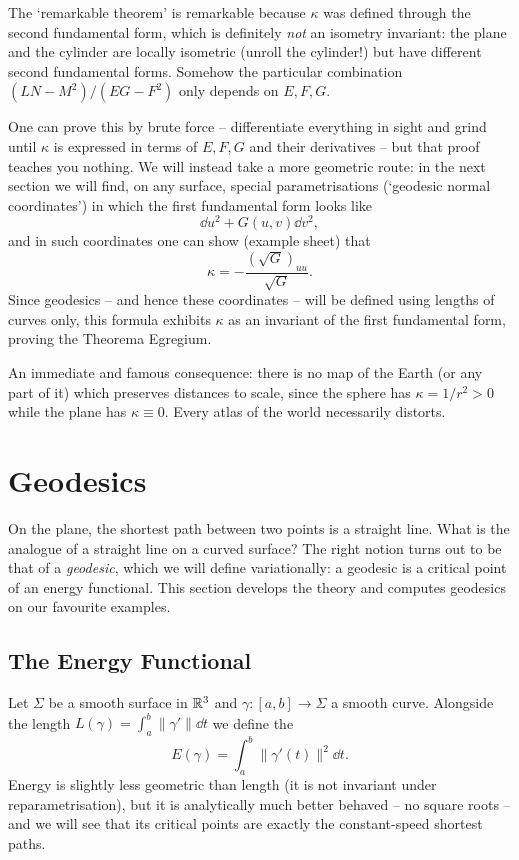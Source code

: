 \documentclass[a4paper]{scrartcl}
\begin{document}
The `remarkable theorem' is remarkable because $\kappa$ was defined through the second fundamental form, which is definitely \emph{not} an isometry invariant: the plane and the cylinder are locally isometric (unroll the cylinder!) but have different second fundamental forms. Somehow the particular combination $(LN - M^2)/(EG - F^2)$ only depends on $E, F, G$.

One can prove this by brute force -- differentiate everything in sight and grind until $\kappa$ is expressed in terms of $E, F, G$ and their derivatives -- but that proof teaches you nothing. We will instead take a more geometric route: in the next section we will find, on any surface, special parametrisations (`geodesic normal coordinates') in which the first fundamental form looks like
$$
\dd u^2 + G(u,v) \dd v^2,
$$
and in such coordinates one can show (example sheet) that
$$
\kappa = -\frac{(\sqrt{G})_{uu}}{\sqrt{G}}.
$$
Since geodesics -- and hence these coordinates -- will be defined using lengths of curves only, this formula exhibits $\kappa$ as an invariant of the first fundamental form, proving the Theorema Egregium.

An immediate and famous consequence: there is no map of the Earth (or any part of it) which preserves distances to scale, since the sphere has $\kappa = 1/r^2 > 0$ while the plane has $\kappa \equiv 0$. Every atlas of the world necessarily distorts.

\section{Geodesics}

On the plane, the shortest path between two points is a straight line. What is the analogue of a straight line on a curved surface? The right notion turns out to be that of a \emph{geodesic}, which we will define variationally: a geodesic is a critical point of an energy functional. This section develops the theory and computes geodesics on our favourite examples.

\subsection{The Energy Functional}

Let $\Sigma$ be a smooth surface in $\mathbb{R}^3$ and $\gamma: [a, b] \rightarrow \Sigma$ a smooth curve. Alongside the length $L(\gamma) = \int_a^b \|\gamma'\|\dd t$ we define the 
$$
E(\gamma) = \int_a^b \|\gamma'(t)\|^2 \dd t.
$$
Energy is slightly less geometric than length (it is not invariant under reparametrisation), but it is analytically much better behaved -- no square roots -- and we will see that its critical points are exactly the constant-speed shortest paths.
\end{document}
